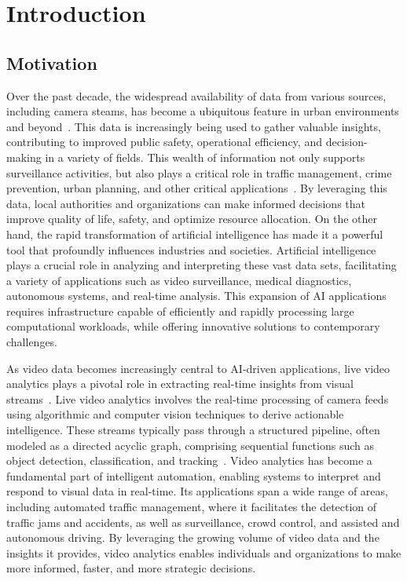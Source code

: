 \setchapterpreamble[u]{\margintoc}
\chapter{Introduction}

\section{Motivation}

Over the past decade, the widespread availability of data from various sources, including camera steams, has become a ubiquitous feature in urban environments and beyond~\cite{yu2023urban,tekouabou2022identifying}. This data is increasingly being used to gather valuable insights, contributing to improved public safety, operational efficiency, and decision-making in a variety of fields. This wealth of information not only supports surveillance activities, but also plays a critical role in traffic management, crime prevention, urban planning, and other critical applications~\cite{hu2023edge,xu2023edge,xu2023mobile,hossain2018edge}. By leveraging this data, local authorities and organizations can make informed decisions that improve quality of life, safety, and optimize resource allocation.
On the other hand, the rapid transformation of artificial intelligence has made it a powerful tool that profoundly influences industries and societies. Artificial intelligence plays a crucial role in analyzing and interpreting these vast data sets, facilitating a variety of applications such as video surveillance, medical diagnostics, autonomous systems, and real-time analysis. This expansion of AI applications requires infrastructure capable of efficiently and rapidly processing large computational workloads, while offering innovative solutions to contemporary challenges.

As video data becomes increasingly central to AI-driven applications, live video analytics plays a pivotal role in extracting real-time insights from visual streams~\cite{hu2023edge,xu2023edge}. Live video analytics involves the real-time processing of camera feeds using algorithmic and computer vision techniques to derive actionable intelligence. These streams typically pass through a structured pipeline, often modeled as a directed acyclic graph, comprising sequential functions such as object detection, classification, and tracking~\cite{zeng2020distream,jiang2018chameleon,hung2018videoedge,201465videostorm}. Video analytics has become a fundamental part of intelligent automation, enabling systems to interpret and respond to visual data in real-time. Its applications span a wide range of areas, including automated traffic management, where it facilitates the detection of traffic jams and accidents, as well as surveillance, crowd control, and assisted and autonomous driving. By leveraging the growing volume of video data and the insights it provides, video analytics enables individuals and organizations to make more informed, faster, and more strategic decisions.

